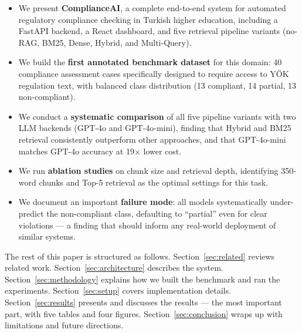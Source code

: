 \begin{itemize}
  \item We present \textbf{ComplianceAI}, a complete end-to-end system for
    automated regulatory compliance checking in Turkish higher education,
    including a FastAPI backend, a React dashboard, and five retrieval pipeline
    variants (no-RAG, BM25, Dense, Hybrid, and Multi-Query).

  \item We build the \textbf{first annotated benchmark dataset} for this domain:
    40 compliance assessment cases specifically designed to require access to
    YÖK regulation text, with balanced class distribution (13 compliant,
    14 partial, 13 non-compliant).

  \item We conduct a \textbf{systematic comparison} of all five pipeline variants
    with two LLM backends (GPT-4o and GPT-4o-mini), finding that Hybrid and
    BM25 retrieval consistently outperform other approaches, and that
    GPT-4o-mini matches GPT-4o accuracy at 19$\times$ lower cost.

  \item We run \textbf{ablation studies} on chunk size and retrieval depth,
    identifying 350-word chunks and Top-5 retrieval as the optimal settings
    for this task.

  \item We document an important \textbf{failure mode}: all models
    systematically under-predict the non-compliant class, defaulting to
    ``partial'' even for clear violations --- a finding that should
    inform any real-world deployment of similar systems.
\end{itemize}

The rest of this paper is structured as follows.
Section~\ref{sec:related} reviews related work.
Section~\ref{sec:architecture} describes the system.
Section~\ref{sec:methodology} explains how we built the benchmark and ran
the experiments.
Section~\ref{sec:setup} covers implementation details.
Section~\ref{sec:results} presents and discusses the results ---
the most important part, with five tables and four figures.
Section~\ref{sec:conclusion} wraps up with limitations and future directions.
